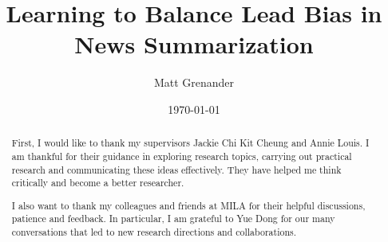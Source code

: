 \documentclass[12pt, oneside, extrafontsizes]{memoir}  %
\theoremstyle{plain}
\theoremstyle{definition}
\begin{document}

\pretitle{\begin{center}\cftchapterfont\huge}
\posttitle{\end{center}}
\preauthor{\begin{center}\huge}
\postauthor{\end{center}}
\predate{\begin{center}\large}
\postdate{\end{center}}

\title{Learning to Balance Lead Bias in News Summarization}
\author{Matt Grenander}
\date{\today}
\renewcommand\maketitlehookb{
\vfill
}
\renewcommand\maketitlehookc{
\vfill
\begin{center}
{
\large
Department of Computer Science\\
McGill University, Montreal
}
\end{center}
\vspace{10mm}
}
\renewcommand\maketitlehookd{
\vspace{10mm}
\begin{center}
A thesis submitted to McGill University in partial fulfilment of the requirements of
the degree of Master of Science. \\
\copyright 2020 Matt Grenander
\end{center}
}

\begin{titlingpage}
\maketitle
\end{titlingpage}


\clearpage
{}
\renewcommand{\abstractname}{Acknowledgements}
\begin{abstract}
First, I would like to thank my supervisors Jackie Chi Kit Cheung and Annie Louis. I am thankful for their guidance in exploring research topics, carrying out practical research and communicating these ideas effectively. They have helped me think critically and become a better researcher.

I also want to thank my colleagues and friends at MILA for their helpful discussions, patience and feedback. In particular, I am grateful to Yue Dong for our many conversations that led to new research directions and collaborations.
\end{abstract}
\end{document}
